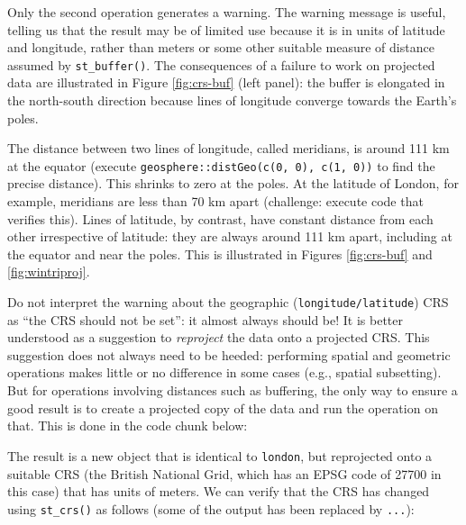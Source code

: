 \documentclass[]{krantz}
\newenvironment{Shaded}{\begin{snugshade}}{\end{snugshade}}
\newcommand{\DataTypeTok}[1]{\textcolor[rgb]{0.27,0.27,0.27}{#1}}
\newcommand{\DecValTok}[1]{\textcolor[rgb]{0.06,0.06,0.06}{#1}}
\newcommand{\KeywordTok}[1]{\textcolor[rgb]{0.27,0.27,0.27}{\textbf{#1}}}
\newcommand{\NormalTok}[1]{#1}
\newcommand{\OperatorTok}[1]{\textcolor[rgb]{0.43,0.43,0.43}{\textbf{#1}}}
\newcommand{\StringTok}[1]{\textcolor[rgb]{0.5,0.5,0.5}{#1}}
\let\BeginKnitrBlock\begin \let\EndKnitrBlock\end
\begin{document}
Only the second operation generates a warning.
The warning message is useful, telling us that the result may be of limited use because it is in units of latitude and longitude, rather than meters or some other suitable measure of distance assumed by \texttt{st\_buffer()}.
The consequences of a failure to work on projected data are illustrated in Figure \ref{fig:crs-buf} (left panel):
the buffer is elongated in the north-south direction because lines of longitude converge towards the Earth's poles.

\BeginKnitrBlock{rmdnote}
The distance between two lines of longitude, called meridians, is around 111 km at the equator (execute \texttt{geosphere::distGeo(c(0,\ 0),\ c(1,\ 0))} to find the precise distance).
This shrinks to zero at the poles.
At the latitude of London, for example, meridians are less than 70 km apart (challenge: execute code that verifies this).
Lines of latitude, by contrast, have constant distance from each other irrespective of latitude: they are always around 111 km apart, including at the equator and near the poles.
This is illustrated in Figures \ref{fig:crs-buf} and \ref{fig:wintriproj}.
\EndKnitrBlock{rmdnote}

Do not interpret the warning about the geographic (\texttt{longitude/latitude}) CRS as ``the CRS should not be set'': it almost always should be!
It is better understood as a suggestion to \emph{reproject} the data onto a projected CRS.
This suggestion does not always need to be heeded: performing spatial and geometric operations makes little or no difference in some cases (e.g., spatial subsetting).
But for operations involving distances such as buffering, the only way to ensure a good result is to create a projected copy of the data and run the operation on that.
This is done in the code chunk below:

\begin{Shaded}
\end{Shaded}

The result is a new object that is identical to \texttt{london}, but reprojected onto a suitable CRS (the British National Grid, which has an EPSG code of 27700 in this case) that has units of meters.
We can verify that the CRS has changed using \texttt{st\_crs()} as follows (some of the output has been replaced by \texttt{...}):
\end{document}
